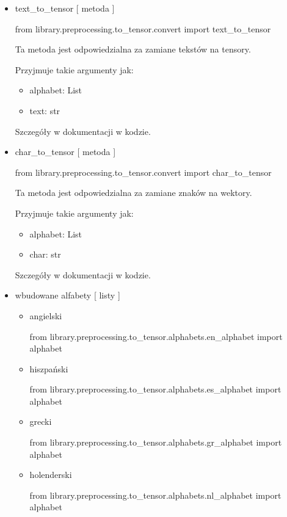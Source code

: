 \begin{itemize}

\item{text\_to\_tensor [ metoda ] }

\begin{import}
from library.preprocessing.to_tensor.convert import text_to_tensor
\end{import}
	
Ta metoda jest odpowiedzialna za zamiane tekstów na tensory.

Przyjmuje takie argumenty jak: 

\begin{itemize}
	\item alphabet: List
	\item text: str
\end{itemize}

Szczegóły w dokumentacji w kodzie.

\item{char\_to\_tensor [ metoda ] }
\begin{import}
from library.preprocessing.to_tensor.convert import char_to_tensor
\end{import}
Ta metoda jest odpowiedzialna za zamiane znaków na wektory.

Przyjmuje takie argumenty jak: 

\begin{itemize}
	\item alphabet: List
	\item char: str
\end{itemize}

Szczegóły w dokumentacji w kodzie.


\item{wbudowane alfabety [ listy ] }

\begin{itemize} 

\item angielski
\begin{import}
from library.preprocessing.to_tensor.alphabets.en_alphabet import alphabet
\end{import}


\item hiszpański
\begin{import}
from library.preprocessing.to_tensor.alphabets.es_alphabet import alphabet
\end{import}


\item grecki
\begin{import}
from library.preprocessing.to_tensor.alphabets.gr_alphabet import alphabet
\end{import}


\item holenderski
\begin{import}
from library.preprocessing.to_tensor.alphabets.nl_alphabet import alphabet
\end{import}
	
\end{itemize}

\end{itemize}


